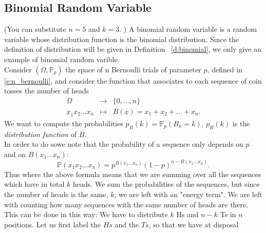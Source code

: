 \subsection{Binomial Random Variable}
(You can substitute $n = 5$ and $k = 3$. )
A binomial random variable is a random variable whose distribution function is the binomial distribution. Since the definition of distribution will be given in Definition ~\ref{d:binomial}, we only give an example of binomial random varible. \\
Consider $(\Omega, \mathbb P_p)$ the space of n Bernoulli trials of parameter $p$, defined in  \eqref{e:n_bernoulli}, and consider the function that associates to each sequence of coin tosses the number of heads
\begin{equation}
    \begin{array}{ccc}
    \Omega & \to & \{0,...,n\}\\
    \underline x_1x_2...x_n & \mapsto &  B( \underline x) = x_1 + x_2+ ... + x_n.
    \end{array}
\end{equation}
We want to compute the probabilities $p_B(k)= \mathbb P_p(B_n = k )$. $p_B(k)$ is the \emph{distribution function} of $B$.\\
In order to do sowe note that the probability of a sequence only depends on $p$ and on $B(x_1...x_n)$:
$$\mathbb P( x_1x_2...x_n) = p^{B(x_1...x_n)}(1-p)^{n- B(x_1...x_n)}.$$
Thus 
where the above formula means that we are summing over all the sequences which have in total $k$ heads. We sum the probabilities of the sequences, but since the number of heads is the same, $k$, we are left with an "energy term". 
We are left with counting how many sequences with the same number of heads are there. This can be done in this way: We have to distribute $k$ Hs and $n-k$ Ts in $n$ positions. Let us first label the $Hs$ and the $Ts$, so that we have at disposal 
